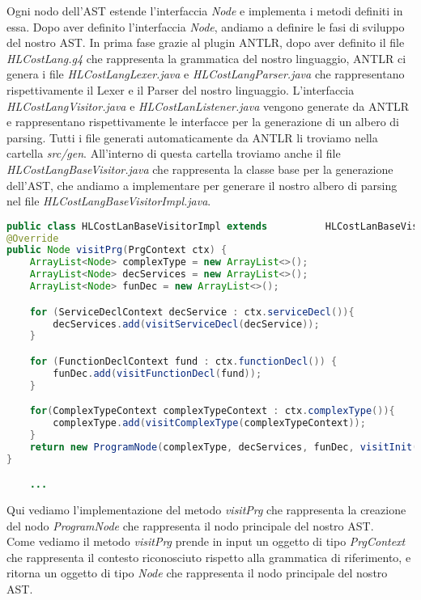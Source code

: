\documentclass[../../main.tex]{subfiles}
\begin{document}
Ogni nodo dell'AST estende l'interfaccia \textit{Node} e implementa i metodi definiti in essa. 
Dopo aver definito l'interfaccia \textit{Node}, andiamo a definire le fasi di sviluppo del nostro AST.
In prima fase grazie al plugin ANTLR, dopo aver definito il file \textit{HLCostLang.g4} che rappresenta la grammatica del nostro linguaggio, ANTLR ci genera i file \textit{HLCostLangLexer.java} e \textit{HLCostLangParser.java} che rappresentano rispettivamente il Lexer e il Parser del nostro linguaggio. 
L'interfaccia \textit{HLCostLangVisitor.java} e \textit{HLCostLanListener.java} vengono generate da ANTLR e rappresentano rispettivamente le interfacce per la generazione di un albero di parsing. 
Tutti i file generati automaticamente da ANTLR li troviamo nella cartella \textit{src/gen}.
All'interno di questa cartella troviamo anche il file \textit{HLCostLangBaseVisitor.java} che rappresenta la classe base per la generazione dell'AST, che andiamo a implementare per generare il nostro albero di parsing nel file \textit{HLCostLangBaseVisitorImpl.java}.\\
\begin{lstlisting}[language=Java, caption={Implementazione del Visitor AST}] 
public class HLCostLanBaseVisitorImpl extends          HLCostLanBaseVisitor<Node> {
@Override
public Node visitPrg(PrgContext ctx) {
    ArrayList<Node> complexType = new ArrayList<>();
    ArrayList<Node> decServices = new ArrayList<>();
    ArrayList<Node> funDec = new ArrayList<>();

    for (ServiceDeclContext decService : ctx.serviceDecl()){
        decServices.add(visitServiceDecl(decService));
    }

    for (FunctionDeclContext fund : ctx.functionDecl()) {
        funDec.add(visitFunctionDecl(fund));
    }

    for(ComplexTypeContext complexTypeContext : ctx.complexType()){
        complexType.add(visitComplexType(complexTypeContext));
    }
    return new ProgramNode(complexType, decServices, funDec, visitInit(ctx.init()));
}

    ...
\end{lstlisting}
Qui vediamo l'implementazione del metodo \textit{visitPrg} che rappresenta la creazione del nodo \textit{ProgramNode} che rappresenta il nodo principale del nostro AST.\\
Come vediamo il metodo \textit{visitPrg} prende in input un oggetto di tipo \textit{PrgContext} che rappresenta il contesto riconosciuto rispetto alla grammatica di riferimento, e ritorna un oggetto di tipo \textit{Node} che rappresenta il nodo principale del nostro AST.\\
\end{document}
